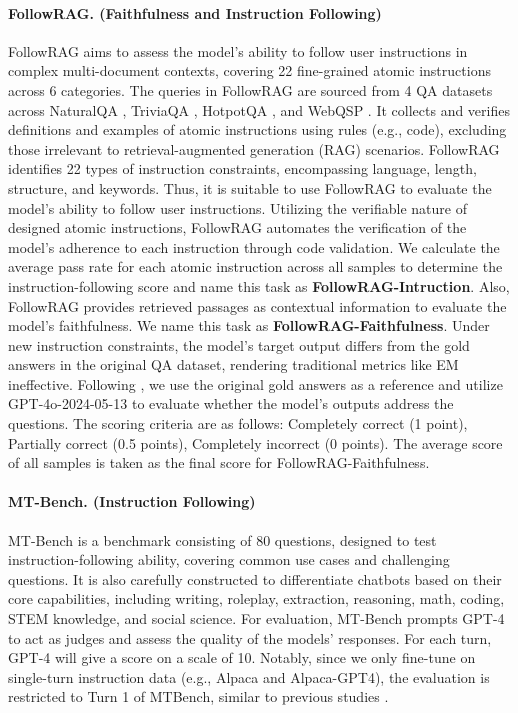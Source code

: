 \paragraph{FollowRAG. (Faithfulness and Instruction Following)}
FollowRAG aims to assess the model’s ability to follow user instructions in complex multi-document contexts, covering 22 fine-grained atomic instructions across 6 categories. 
The queries in FollowRAG are sourced from 4 QA datasets across NaturalQA \citep{47761}, TriviaQA \citep{joshi-etal-2017-triviaqa}, HotpotQA \citep{yang-etal-2018-hotpotqa}, and WebQSP \citep{Yih2016TheVO}.
It collects and verifies definitions and examples of atomic instructions using rules (e.g., code), excluding those irrelevant to retrieval-augmented generation (RAG) scenarios.
FollowRAG identifies 22 types of instruction constraints, encompassing language, length, structure, and keywords.
Thus, it is suitable to use FollowRAG to evaluate the model’s ability to follow user instructions.
Utilizing the verifiable nature of designed atomic instructions, FollowRAG automates the verification of the model’s adherence to each instruction through code validation.
We calculate the average pass rate for each atomic instruction across all samples to determine the instruction-following score and name this task as \textbf{FollowRAG-Intruction}.
Also, FollowRAG provides retrieved passages as contextual information to evaluate the model's faithfulness.
We name this task as \textbf{FollowRAG-Faithfulness}.
Under new instruction constraints, the model’s target output differs from the gold answers in the original QA dataset, rendering traditional metrics like EM ineffective.
Following \citet{dong2024generalinstructionfollowingalignmentretrievalaugmented}, we use the original gold answers as a reference and utilize GPT-4o-2024-05-13 to evaluate whether the model’s outputs address the questions.
The scoring criteria are as follows: Completely correct (1 point), Partially correct (0.5 points), Completely incorrect (0 points). 
The average score of all samples is taken as the final score for FollowRAG-Faithfulness.

\paragraph{MT-Bench. (Instruction Following)}
MT-Bench is a benchmark consisting of 80 questions, designed to test instruction-following ability, covering common use cases and challenging questions. 
It is also carefully constructed to differentiate chatbots based on their core capabilities, including writing, roleplay, extraction, reasoning, math, coding, STEM knowledge, and social science. 
For evaluation, MT-Bench prompts GPT-4 to act as judges and assess the quality of the models’ responses. 
For each turn, GPT-4 will give a score on a scale of 10. 
Notably, since we only fine-tune on single-turn instruction data (e.g., Alpaca and Alpaca-GPT4), the evaluation is restricted to Turn 1 of MTBench, similar to previous studies \citep{li2024shot}.


